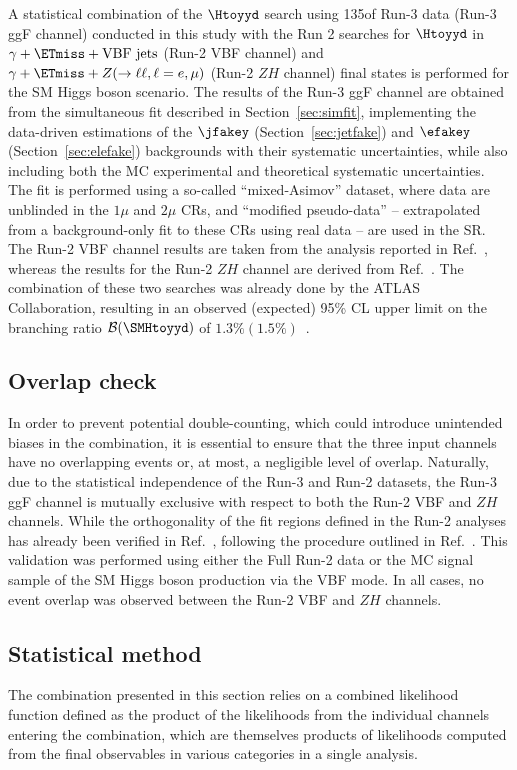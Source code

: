 A statistical combination of the $\Htoyyd$ search using 135\fbinv of Run-3 data (Run-3 ggF channel) conducted in this study with the Run 2 searches for $\Htoyyd$ in $\gamma + \ETmiss + \text{VBF jets}$ (Run-2 VBF channel) and $\gamma + \ETmiss + Z(\to\ell\ell, \ell = e,\mu)$ (Run-2 $ZH$ channel) final states is performed for the SM Higgs boson scenario.
The results of the Run-3 ggF channel are obtained from the simultaneous fit described in Section~\ref{sec:simfit}, implementing the data-driven estimations of the $\jfakey$ (Section~\ref{sec:jetfake}) and $\efakey$ (Section~\ref{sec:elefake}) backgrounds with their systematic uncertainties, while also including both the MC experimental and theoretical systematic uncertainties.
The fit is performed using a so-called ``mixed-Asimov'' dataset, where data are unblinded in the $1\mu$ and $2\mu$ CRs, and ``modified pseudo-data'' -- extrapolated from a background-only fit to these CRs using real data -- are used in the SR.
The Run-2 VBF channel results are taken from the analysis reported in Ref.~\cite{EXOT-2021-17}, whereas the results for the Run-2 $ZH$ channel are derived from Ref.~\cite{HDBS-2019-13}.
The combination of these two searches was already done by the ATLAS Collaboration, resulting in an observed (expected) 95\% CL upper limit on the branching ratio $\mathcal{B}(\SMHtoyyd)$ of $1.3\%(1.5\%)$~\cite{ATLAS:2024cju}.

\subsection{Overlap check}
\label{sec:overlap_check}
In order to prevent potential double-counting, which could introduce unintended biases in the combination, it is essential to ensure that the three input channels have no overlapping events or, at most, a negligible level of overlap.
Naturally, due to the statistical independence of the Run-3 and Run-2 datasets, the Run-3 ggF channel is mutually exclusive with respect to both the Run-2 VBF and $ZH$ channels.
While the orthogonality of the fit regions defined in the Run-2 analyses has already been verified in Ref.~\cite{ATLAS:2024cju}, following the procedure outlined in Ref.~\cite{overlapprocedure}.
This validation was performed using either the Full Run-2 data or the MC signal sample of the SM Higgs boson production via the VBF mode.
In all cases, no event overlap was observed between the Run-2 VBF and $ZH$ channels.

\subsection{Statistical method}
\label{sec:stat_method}
The combination presented in this section relies on a combined likelihood function defined as the product of the likelihoods from the individual channels entering the combination, which are themselves products of likelihoods computed from the final observables in various categories in a single analysis.

